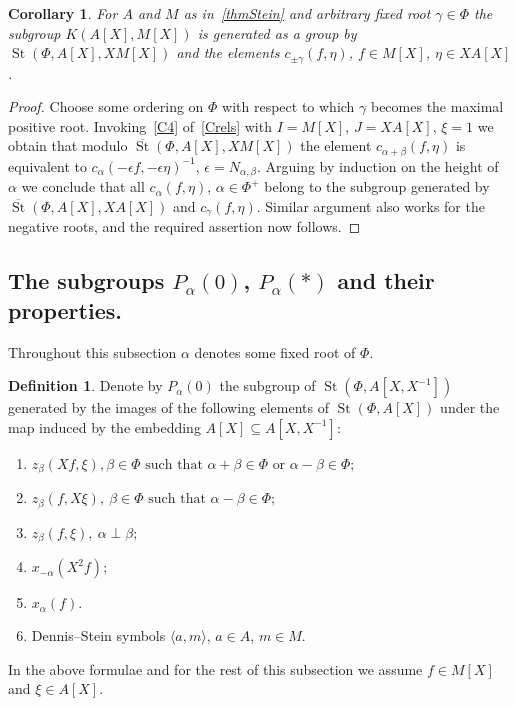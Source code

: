 \documentclass[oneside, 8pt]{amsart}
\newtheorem{corollary}{Corollary}
\theoremstyle{remark}
\theoremstyle{definition}
\newtheorem{df}[lemma]{Definition} \Crefname{df}{Definition}{Definitions}
\DeclareMathOperator{\St}{St}
\numberwithin{equation}{section}
\begin{document}
\begin{corollary} \label{Kgen-strong}
 For $A$ and $M$ as in~\cref{thmStein} and arbitrary fixed root $\gamma\in \Phi$ the subgroup $K(A[X], M[X])$ is generated as a group by $\St(\Phi, A[X], XM[X])$ and the elements $c_{\pm \gamma}(f, \eta)$, $f \in M[X]$, $\eta \in XA[X]$.
\end{corollary}
\begin{proof}
 Choose some ordering on $\Phi$ with respect to which $\gamma$ becomes the maximal positive root. 
 Invoking~\eqref{C4} of~\cref{Crels} with $I = M[X]$, $J=XA[X]$, $\xi = 1$ we obtain that modulo 
 $\overline{\St}(\Phi, A[X], XM[X])$ the element $c_{\alpha + \beta}(f, \eta)$ is equivalent to 
 $c_{\alpha}(-\epsilon f, -\epsilon \eta)^{-1}$, $\epsilon = N_{\alpha, \beta}$. 
 Arguing by induction on the height of $\alpha$ we conclude that all $c_\alpha(f, \eta)$, $\alpha \in \Phi^+$
 belong to the subgroup generated by $\overline{\St}(\Phi, A[X], XA[X])$ and $c_\gamma(f, \eta)$.
 Similar argument also works for the negative roots, and the required assertion now follows.
\end{proof}

\subsection{The subgroups $P_\alpha(0)$, $P_\alpha(*)$ and their properties.} Throughout this subsection $\alpha$ denotes some fixed root of $\Phi$.
\begin{df} \label{defP0}
Denote by $P_\alpha(0)$ the subgroup of $\St(\Phi, A[X, X^{-1}])$ generated by the images of the following elements of $\St(\Phi, A[X])$ under the
 map induced by the embedding $A[X] \subseteq A[X, X^{-1}]$:
\begin{enumerate}
 \item $z_{\beta}(Xf, \xi), \beta \in \Phi \text{ such that }\alpha + \beta \in \Phi\text{ or } \alpha - \beta \in \Phi;$
 \item $z_{\beta}(f, X\xi),\ \beta \in \Phi \text{ such that }\alpha - \beta \in \Phi;$
 \item $z_{\beta}(f, \xi),\ \alpha \perp \beta;$
 \item $x_{-\alpha}(X^2f);$
 \item $x_{\alpha}(f).$ 
 \item Dennis--Stein symbols $\langle a, m \rangle$, $a\in A$, $m\in M$.
\end{enumerate}
In the above formulae and for the rest of this subsection we assume $f \in M[X]$ and $\xi \in A[X]$.
\end{df}
\end{document}
